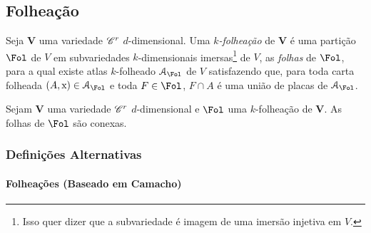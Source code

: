 

\subsection{Folheação}

\begin{defi}
Seja $\bm V$ uma variedade $\mathscr{C}^r$ $d$-dimensional. Uma \emph{$k$-folheação} de $\bm V$ é uma partição $\Fol$ de $V$ em subvariedades $k$-dimensionais imersas\footnote{Isso quer dizer que a subvariedade é imagem de uma imersão injetiva em $V$.} de $V$, as \emph{folhas} de $\Fol$, para a qual existe atlas $k$-folheado $\atlas_\Fol$ de $V$ satisfazendo que, para toda carta folheada $(A,\x) \in \atlas_\Fol$ e toda $F \in \Fol$, $F \cap A$ é uma união de placas de $\atlas_\Fol$.
\end{defi}

\begin{prop}
Sejam $\bm V$ uma variedade $\mathscr{C}^r$ $d$-dimensional e $\Fol$ uma $k$-folheação de $\bm V$. As folhas de $\Fol$ são conexas.
\end{prop}



\subsubsection{Definições Alternativas}

\paragraph{Folheações (Baseado em Camacho)}

